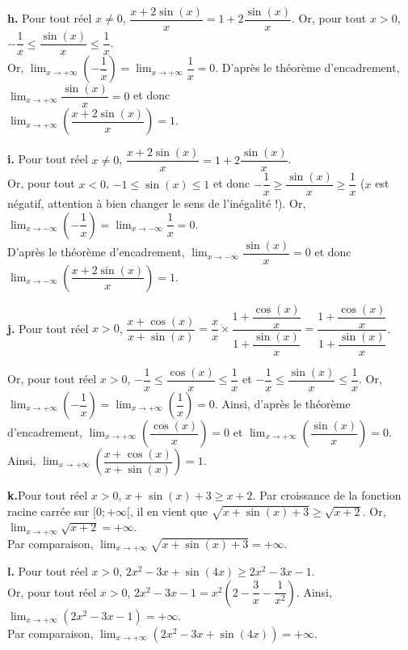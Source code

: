 \documentclass[11pt,fleqn, openany]{book} %
\begin{document}
\begin{solution}
\textbf{h.} Pour tout réel $x\neq 0$, $\dfrac{x+2\sin(x)}{x}=1+2\dfrac{\sin(x)}{x}$. Or, pour tout $x>0$, $-\dfrac{1}{x} \leqslant \dfrac{\sin(x)}{x} \leqslant \dfrac{1}{x}$.\\ Or, $\displaystyle\lim_{x\to+\infty}\left(-\dfrac{1}{x}\right)=\displaystyle\lim_{x\to+\infty}\dfrac{1}{x}=0$. D'après le théorème d'encadrement, $\displaystyle\lim_{x\to+\infty}\dfrac{\sin(x)}{x}=0$ et donc \\ $\displaystyle\lim_{x\to+\infty}\left(\dfrac{x+2\sin(x)}{x}\right)=1$.
   
\textbf{i.} Pour tout réel $x\neq 0$, $\dfrac{x+2\sin(x)}{x}=1+2\dfrac{\sin(x)}{x}$.\\ Or, pour tout $x<0$, $-1 \leqslant \sin(x)\leqslant 1$ et donc $-\dfrac{1}{x} \geqslant \dfrac{\sin(x)}{x} \geqslant \dfrac{1}{x}$ ($x$ est négatif, attention à bien changer le sens de l'inégalité !). Or, $\displaystyle\lim_{x\to-\infty}\left(-\dfrac{1}{x}\right)=\displaystyle\lim_{x\to-\infty}\dfrac{1}{x}=0$. \\ D'après le théorème d'encadrement, $\displaystyle\lim_{x\to-\infty}\dfrac{\sin(x)}{x}=0$ et donc $\displaystyle\lim_{x\to-\infty}\left(\dfrac{x+2\sin(x)}{x}\right)=1$.
    
\textbf{j.} Pour tout réel $x>0$, $\dfrac{x+\cos(x)}{x+\sin(x)}=\dfrac{x}{x}\times \dfrac{1+\dfrac{\cos(x)}{x}}{1+\dfrac{\sin(x)}{x}}=\dfrac{1+\dfrac{\cos(x)}{x}}{1+\dfrac{\sin(x)}{x}}$.

Or, pour tout réel $x>0$, $-\dfrac{1}{x} \leqslant \dfrac{\cos(x)}{x}\leqslant \dfrac{1}{x}$ et $-\dfrac{1}{x} \leqslant \dfrac{\sin(x)}{x}\leqslant \dfrac{1}{x}$. Or, $\displaystyle\lim_{x\to +\infty}\left(-\dfrac{1}{x}\right)=\displaystyle\lim_{x\to +\infty}\left(\dfrac{1}{x}\right)=0$. Ainsi, d'après le théorème d'encadrement, $\displaystyle\lim_{x\to +\infty}\left(\dfrac{\cos(x)}{x}\right)=0$ et $\displaystyle\lim_{x\to +\infty}\left(\dfrac{\sin(x)}{x}\right)=0$. \\ Ainsi, $\displaystyle\lim_{x\to +\infty}\left(\dfrac{x+\cos(x)}{x+\sin(x)}\right)=1$.
     
\textbf{k.}Pour tout réel $x>0$, $x+\sin(x)+3 \geqslant x+2$. Par croissance de la fonction racine carrée sur $[0;+\infty[$, il en vient que $\sqrt{x+\sin(x)+3}\geqslant \sqrt{x+2}$. Or, $\displaystyle\lim_{x\to+\infty}\sqrt{x+2}=+\infty$.\\  Par comparaison, $\displaystyle\lim_{x\to+\infty}\sqrt{x+\sin(x)+3}=+\infty$.
      
\textbf{l.} Pour tout réel $x>0$, $2x^2-3x+\sin(4x)\geqslant 2x^2-3x-1$. \\ Or, pour tout réel $x>0$, $2x^2-3x-1 =x^2\left(2-\dfrac{3}{x}-\dfrac{1}{x^2}\right)$. Ainsi, $\displaystyle\lim_{x\to +\infty}(2x^2-3x-1)=+\infty$.\\ Par comparaison, $\displaystyle\lim_{x\to +\infty}(2x^2-3x+\sin(4x))=+\infty$.
 
 \end{solution}
 
\end{document}
